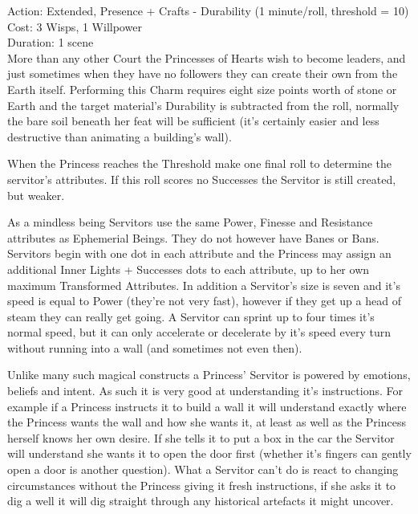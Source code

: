 \noindent Action: Extended, Presence + Crafts - Durability (1 minute/roll, threshold = 10)\\

\noindent Cost: 3 Wisps, 1 Willpower\\

\noindent Duration: 1 scene\\

\noindent More than any other Court the Princesses of Hearts wish to become leaders, and just sometimes when they have no followers they can create their own from the Earth itself. Performing this Charm requires eight size points worth of stone or Earth and the target material's Durability is subtracted from the roll, normally the bare soil beneath her feat will be sufficient (it's certainly easier and less destructive than animating a building's wall).

When the Princess reaches the Threshold make one final roll to determine the servitor’s attributes. If this roll scores no Successes the Servitor is still created, but weaker.

As a mindless being Servitors use the same Power, Finesse and Resistance attributes as Ephemerial Beings. They do not however have Banes or Bans. Servitors begin with one dot in each attribute and the Princess may assign an additional Inner Lights + Successes dots to each attribute, up to her own maximum Transformed Attributes. In addition a Servitor's size is seven and it's speed is equal to Power (they're not very fast), however if they get up a head of steam they can really get going. A Servitor can sprint up to four times it's normal speed, but it can only accelerate or decelerate by it's speed every turn without running into a wall (and sometimes not even then).

Unlike many such magical constructs a Princess' Servitor is powered by emotions, beliefs and intent. As such it is very good at understanding it's instructions. For example if a Princess instructs it to build a wall it will understand exactly where the Princess wants the wall and how she wants it, at least as well as the Princess herself knows her own desire. If she tells it to put a box in the car the Servitor will understand she wants it to open the door first (whether it's fingers can gently open a door is another question). What a Servitor can't do is react to changing circumstances without the Princess giving it fresh instructions, if she asks it to dig a well it will dig straight through any historical artefacts it might uncover.

